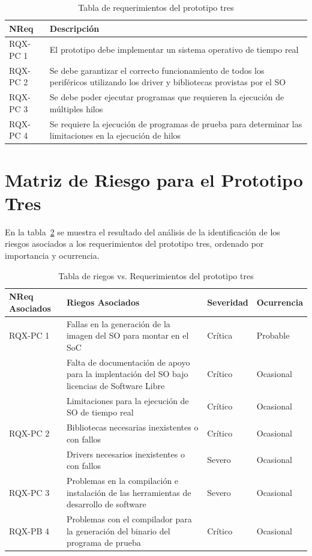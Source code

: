 		\begin{table}[h!]
		\centering		
		\begin{tabular}{ p{2.5cm} p{12.5cm}}
		\hline 
		\rowcolor[gray]{0.8} N\textordmasculine Req & Descripción\\
		\hline 
		RQX-PC 1 & El prototipo debe implementar un sistema operativo de tiempo real\\ 
		\hline 
		RQX-PC 2 & Se debe garantizar el correcto funcionamiento de todos los periféricos utilizando los driver y bibliotecas provistas por el SO \\ 
		\hline 
		RQX-PC 3 & Se debe poder ejecutar programas que requieren la ejecución de múltiples hilos  \\ 
		\hline
		RQX-PC 4 & Se requiere la ejecución de programas de prueba para determinar las limitaciones en la ejecución de hilos \\ 
		\hline		
		\end{tabular}
		\caption{Tabla de requerimientos del prototipo tres}
		\label{tab:tdr3}
		\end{table}
\newpage		

		\section{Matriz de Riesgo para el Prototipo Tres} 
En la tabla~\ref{tab:riegos3} se muestra el resultado del análisis de la identificación de los riesgos asociados a los requerimientos del prototipo tres, ordenado por importancia y ocurrencia.
		\begin{table}[h!]
		\centering
		\begin{tabular}{ p{2.5cm} p{9cm} p{1.5cm} p{2cm} }
		\hline 
		\rowcolor[gray]{0.8} N\textordmasculine Req Asociados& Riegos Asociados & Severidad  & Ocurrencia \\
		\hline
		RQX-PC 1& Fallas en la generación de la imagen del SO para montar en el SoC & Crítica       & Probable \\
		\hline				
				& Falta de documentación de apoyo para la implentación del SO bajo licencias de Software Libre & Crítico & Ocasional\\	
		\hline				
				 & Limitaciones para la ejecución de SO de tiempo real & Crítico & Ocasional\\	
 		
 		\hline	
		RQX-PC 2 	& Bibliotecas necesarias inexistentes o con fallos& Crítico & Ocasional\\	
		
		\hline				
 					 & Drivers necesarios inexistentes o con fallos  & Severo  &  Ocasional\\ 
		\hline	
 		RQX-PC 3	&Problemas en la compilación e instalación de las herramientas de desarrollo de software& Severo  &  Ocasional\\ 
		\hline
		RQX-PB 4 & Problemas con el compilador para la generación del binario del programa de prueba  & Crítico&  Ocasional\\
		\hline
		\end{tabular}
		\caption{Tabla de riegos vs. Requerimientos del prototipo tres}
		\label{tab:riegos3}
		\end{table}

